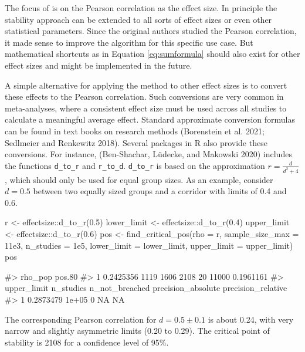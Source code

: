 The focus of  is on the Pearson correlation as the effect size. In principle the stability approach can be extended to all sorts of effect sizes or even other statistical parameters. Since the original authors studied the Pearson correlation, it made sense to improve the algorithm for this specific use case. But mathematical shortcuts as in Equation \eqref{eq:sumformula} should also exist for other effect sizes and might be implemented in the future.

A simple alternative for applying the method to other effect sizes is to convert these effects to the Pearson correlation. Such conversions are very common in meta-analyses, where a consistent effect size must be used across all studies to calculate a meaningful average effect. Standard approximate conversion formulas can be found in text books on research methods (Borenstein et al. 2021; Sedlmeier and Renkewitz 2018). Several packages in R also provide these conversions. For instance,  (Ben-Shachar, Lüdecke, and Makowski 2020) includes the functions \texttt{d\_to\_r} and \texttt{r\_to\_d}. \texttt{d\_to\_r} is based on the approximation \(r = \frac{d}{d^2+4}\), which should only be used for equal group sizes. As an example, consider \(d=0.5\) between two equally sized groups and a corridor with limits of 0.4 and 0.6.

\begin{Schunk}
\begin{Sinput}
r <- effectsize::d_to_r(0.5)
lower_limit <- effectsize::d_to_r(0.4)
upper_limit <- effectsize::d_to_r(0.6)
pos <- find_critical_pos(rho = r, sample_size_max = 11e3, n_studies = 1e5,
                         lower_limit = lower_limit, upper_limit = upper_limit)
pos
\end{Sinput}
\begin{Soutput}
#>     rho_pop pos.80% pos.90% pos.95% sample_size_min sample_size_max lower_limit
#> 1 0.2425356    1119    1606    2108              20           11000   0.1961161
#>   upper_limit n_studies n_not_breached precision_absolute precision_relative
#> 1   0.2873479     1e+05              0                 NA                 NA
\end{Soutput}
\end{Schunk}

The corresponding Pearson correlation for \(d=0.5\pm0.1\) is about 0.24, with very narrow and slightly asymmetric limits (0.20 to 0.29). The critical point of stability is 2108 for a confidence level of 95\%.

